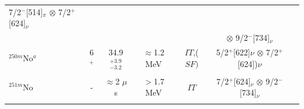 \begin{center}
\begin{longtable}{lcccccl}
                      7/2$^-$[514]$_\pi$ $\otimes$ 7/2$^+$[624]$_\nu$ & \cite{Goigoux2021}\\ 
          &                &             &&&$\otimes$ 9/2$^-$[734]$_\nu$& \\          
$^{250m}$No$^a$&
               6$^{+}$ &  34.9$^{+3.9}_{-3.2}$   & $\approx$1.2 MeV    & $IT$,($SF)$     
              &   5/2$^+$[622]$\nu$ $\otimes$ 7/2$^+$[624])$\nu$  & \cite{Peterson2006}\\
          &        &         &         &            &                & \cite{Kallunkathariyil2020}\\
 $^{251m}$No& -  & $\approx$2 $\mu$s  &$>$1.7 MeV& $IT$  &
                      7/2$^+$[624]$_\nu$ $\otimes$ 9/2$^-$[734]$_\nu$ & \cite{Hessberger2006}\\
        &        &         &         &            &     & \cite{Lopez-Martens2022}\\


\end{longtable}
\end{center}

